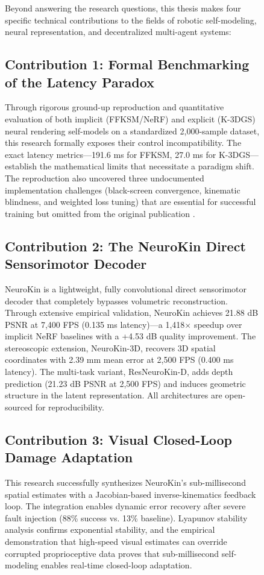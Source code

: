 \documentclass[12pt,a4paper,oneside]{report}
\begin{document}
\begin{figure}[H]
Beyond answering the research questions, this thesis makes four specific technical contributions to the fields of robotic self-modeling, neural representation, and decentralized multi-agent systems:

\subsection{Contribution 1: Formal Benchmarking of the Latency Paradox}

Through rigorous ground-up reproduction and quantitative evaluation of both implicit (FFKSM/NeRF) and explicit (K-3DGS) neural rendering self-models on a standardized 2,000-sample dataset, this research formally exposes their control incompatibility. The exact latency metrics---191.6 ms for FFKSM, 27.0 ms for K-3DGS---establish the mathematical limits that necessitate a paradigm shift. The reproduction also uncovered three undocumented implementation challenges (black-screen convergence, kinematic blindness, and weighted loss tuning) that are essential for successful training but omitted from the original publication \cite{hu2024teaching}.

\subsection{Contribution 2: The NeuroKin Direct Sensorimotor Decoder}

NeuroKin is a lightweight, fully convolutional direct sensorimotor decoder that completely bypasses volumetric reconstruction. Through extensive empirical validation, NeuroKin achieves 21.88 dB PSNR at 7,400 FPS (0.135 ms latency)---a 1,418$\times$ speedup over implicit NeRF baselines with a +4.53 dB quality improvement. The stereoscopic extension, NeuroKin-3D, recovers 3D spatial coordinates with 2.39 mm mean error at 2,500 FPS (0.400 ms latency). The multi-task variant, ResNeuroKin-D, adds depth prediction (21.23 dB PSNR at 2,500 FPS) and induces geometric structure in the latent representation. All architectures are open-sourced for reproducibility.

\subsection{Contribution 3: Visual Closed-Loop Damage Adaptation}

This research successfully synthesizes NeuroKin's sub-millisecond spatial estimates with a Jacobian-based inverse-kinematics feedback loop. The integration enables dynamic error recovery after severe fault injection (88\% success vs. 13\% baseline). Lyapunov stability analysis confirms exponential stability, and the empirical demonstration that high-speed visual estimates can override corrupted proprioceptive data proves that sub-millisecond self-modeling enables real-time closed-loop adaptation.


\end{figure}
\end{document}
